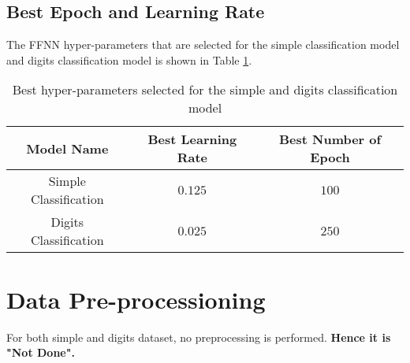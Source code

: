 \documentclass[12pt, a4paper, twoside]{article}
\begin{document}
\subsection{Best Epoch and Learning Rate}
The FFNN hyper-parameters that are selected for the simple classification model and digits classification model is shown in Table \ref{T:hyper}.
\begin{table}[ht]
	\begin{center}
		\begin{tabular}{c c c}
			\hline
			Model Name & Best Learning Rate & Best Number of Epoch \\ \hline
			Simple Classification& $0.125$ & $100$ \\ \hline
			Digits Classification & $0.025$ & $250$ \\ \hline
		\end{tabular}
		\caption{Best hyper-parameters selected for the simple and digits classification  model}\label{T:hyper}
	\end{center}
\end{table}
\section{Data Pre-processioning}
For both simple and digits dataset, no preprocessing is performed. \textbf{Hence it is "Not Done". }
\end{document}
